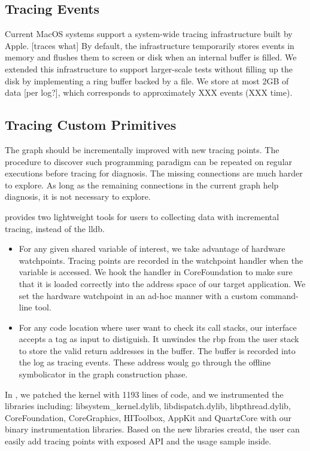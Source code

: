 \subsection{Tracing Events}
Current MacOS systems support a system-wide tracing infrastructure built by Apple. [traces what]
By default, the infrastructure temporarily stores events in memory and flushes them to screen or disk when an internal buffer is filled.
We extended this infrastructure to support larger-scale tests without filling up the disk by implementing a ring buffer backed by a file.
We store at most 2GB of data [per log?], which corresponds to approximately XXX events (XXX time).

\subsection{Tracing Custom Primitives}
The graph should be incrementally improved with new tracing points.
The procedure to discover such programming paradigm can be repeated on regular executions before tracing for diagnosis.
The missing connections are much harder to explore.
As long as the remaining connections in the current graph help diagnosis, it is not necessary to explore.

\xxx provides two lightweight tools for users to collecting data with incremental tracing, instead of the lldb.
\begin {itemize}
\item For any given shared variable of interest, we take advantage of hardware watchpoints.
	Tracing points are recorded in the watchpoint handler when the variable is accessed.
	We hook the handler in CoreFoundation to make sure that it is loaded correctly into the address space of our target application.
	We set the hardware watchpoint in an ad-hoc manner with a custom command-line tool.
\item For any code location where user want to check its call stacks, our interface accepts a tag as input to distiguish.
	It unwindes the rbp from the user stack to store the valid return addresses in the buffer. The buffer is recorded into the log as tracing events.
	These address woulg go through the offline symbolicator in the graph construction phase.
\end{itemize}

In \xxx, we patched the kernel with 1193 lines of code,
and we instrumented the libraries including: libsystem\_kernel.dylib, libdispatch.dylib, libpthread.dylib, CoreFoundation, CoreGraphics, HIToolbox, AppKit and QuartzCore with our binary instrumentation libraries. 
Based on the new libraries creatd, the user can easily add tracing points with exposed API and the usage sample inside.

